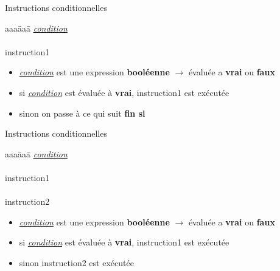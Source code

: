  \begin{frame}{Instructions conditionnelles}
   \begin{minipage}{0.3\linewidth}
     \begin{tabbing}
       aaa\=aaa\=\kill
       {} \underline{\emph{condition}} \\
       {} \\
       \> instruction1 \\
       {}
     \end{tabbing}
   \end{minipage}
   \hfill
   \begin{minipage}{0.6\linewidth}
     \begin{itemize}
     \item \underline{\emph{condition}} est une expression \textbf{booléenne} $\rightarrow$ évaluée a \textbf{vrai} ou \textbf{faux}
     \item si \underline{\emph{condition}} est évaluée à \textbf{vrai}, instruction1 est exécutée
     \item sinon on passe à ce qui suit \textbf{fin si}
     \end{itemize}
   \end{minipage}
 \end{frame}

 
 \begin{frame}{Instructions conditionnelles}
   \begin{minipage}{0.3\linewidth}
     \begin{tabbing}
       aaa\=aaa\=\kill
       {} \underline{\emph{condition}} \\
       {} \\
       \> instruction1 \\
       {} \\
       \> instruction2 \\
       {}
     \end{tabbing}
   \end{minipage}
   \hfill
   \begin{minipage}{0.6\linewidth}
     \begin{itemize}
     \item \underline{\emph{condition}} est une expression \textbf{booléenne} $\rightarrow$ évaluée a \textbf{vrai} ou \textbf{faux}
     \item si \underline{\emph{condition}} est évaluée à \textbf{vrai}, instruction1 est exécutée
     \item sinon instruction2 est exécutée
     \end{itemize}
   \end{minipage}
 \end{frame}


